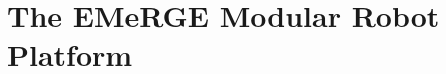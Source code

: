 \documentclass[sigconf]{acmart}
\begin{document}
  


\section{The EMeRGE Modular Robot Platform}
\end{document}
